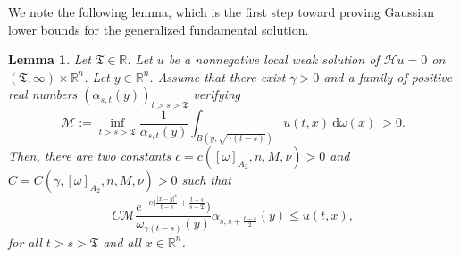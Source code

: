 \documentclass[12pt, letterpaper]{amsart}
\newtheorem{lem}[thm]{Lemma}
\theoremstyle{definition}
\theoremstyle{remark}
\numberwithin{equation}{section}
\begin{document}
We note the following lemma, which is the first step toward proving Gaussian lower bounds for the generalized fundamental solution.
\begin{lem}\label{lem:AronsonSerrin}
    Let $\mathfrak{T} \in \mathbb{R}$. Let $u$ be a nonnegative local weak solution of $\mathcal{H}u=0$ on $(\mathfrak{T},\infty)\times \mathbb{R}^n$. Let $y \in \mathbb{R}^n$. Assume that there exist \(\gamma > 0\) and a family of positive real numbers \((\alpha_{s,t}(y))_{t>s>\mathfrak{T}}\) verifying
    $$ \mathcal{M}:= \inf_{t>s>\mathfrak{T}} \frac{1}{\alpha_{s,t}(y)} \int_{B(y,\sqrt{\gamma(t-s)})} u(t,x)\ \mathrm{d}\omega(x)\ > 0.$$
    Then, there are two constants $c=c([ \omega  ]_{A_2},n,M,\nu)>0$ and $C=C(\gamma,[ \omega  ]_{A_2},n,M,\nu)>0$ such that
    \begin{equation*}
         C \mathcal{M} \frac{e^{-c (\frac{|x-y|^2}{t-s}+\frac{t-s}{s-\mathfrak{T}}})}{\omega_{\gamma(t-s)}(y)} \alpha_{s,s+\frac{t-s}{2}}(y) \leq u(t,x),
    \end{equation*}
    for all $t>s>\mathfrak{T}$ and all $x \in \mathbb{R}^n$.
\end{lem}
\end{document}
